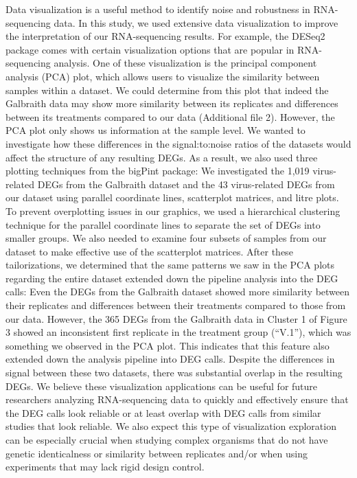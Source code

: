 \documentclass{bmcart}
\begin{document}
\begin{linenumbers}
\begin{doublespacing}
Data visualization is a useful method to identify noise and robustness in RNA-sequencing data. In this study, we used extensive data visualization to improve the interpretation of our RNA-sequencing results. For example, the DESeq2 package comes with certain visualization options that are popular in RNA-sequencing analysis. One of these visualization is the principal component analysis (PCA) plot, which allows users to visualize the similarity between samples within a dataset. We could determine from this plot that indeed the Galbraith data may show more similarity between its replicates and differences between its treatments compared to our data (Additional file 2). However, the PCA plot only shows us information at the sample level. We wanted to investigate how these differences in the signal:to:noise ratios of the datasets would affect the structure of any resulting DEGs. As a result, we also used three plotting techniques from the bigPint package: We investigated the 1,019 virus-related DEGs from the Galbraith dataset and the 43 virus-related DEGs from our dataset using parallel coordinate lines, scatterplot matrices, and litre plots. To prevent overplotting issues in our graphics, we used a hierarchical clustering technique for the parallel coordinate lines to separate the set of DEGs into smaller groups. We also needed to examine four subsets of samples from our dataset to make effective use of the scatterplot matrices. After these tailorizations, we determined that the same patterns we saw in the PCA plots regarding the entire dataset extended down the pipeline analysis into the DEG calls: Even the DEGs from the Galbraith dataset showed more similarity between their replicates and differences between their treatments compared to those from our data. However, the 365 DEGs from the Galbraith data in Cluster 1 of Figure 3 showed an inconsistent first replicate in the treatment group (``V.1''), which was something we observed in the PCA plot. This indicates that this feature also extended down the analysis pipeline into DEG calls. Despite the differences in signal between these two datasets, there was substantial overlap in the resulting DEGs. We believe these visualization applications can be useful for future researchers analyzing RNA-sequencing data to quickly and effectively ensure that the DEG calls look reliable or at least overlap with DEG calls from similar studies that look reliable. We also expect this type of visualization exploration can be especially crucial when studying complex organisms that do not have genetic identicalness or similarity between replicates and/or when using experiments that may lack rigid design control.


\end{doublespacing}
\end{linenumbers}
\end{document}
